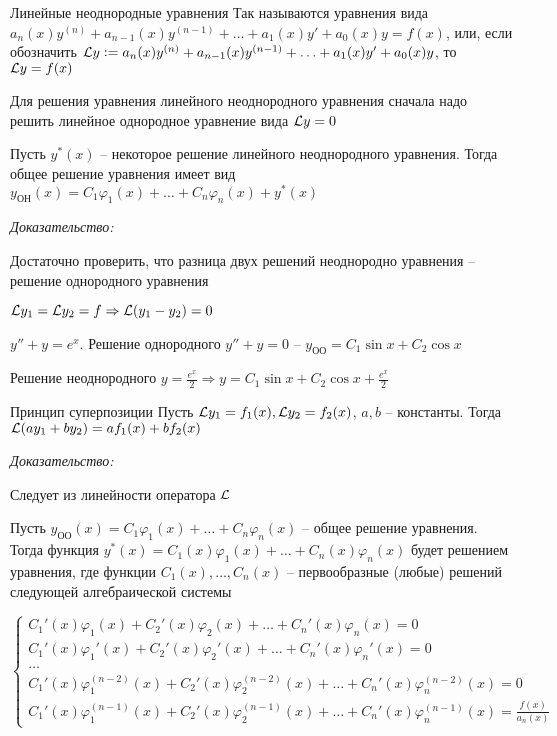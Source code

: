 \documentclass[12pt]{article}
\begin{document}
\begin{defin}{Линейные неоднородные уравнения}
    Так называются уравнения вида $a_n(x)y^{(n)} + a_{n - 1}(x)y^{(n - 1)} + \ldots + a_1(x)y' + a_0(x)y = f(x)$, или, если обозначить $\mathcal{L} y := a_n(x)y^{(n)} + a_{n - 1}(x)y^{(n - 1)} + \ldots + a_1(x)y' + a_0(x)y$, то $\mathcal{L} y = f(x)$

    Для решения уравнения линейного неоднородного уравнения сначала надо решить линейное однородное уравнение вида $\mathcal{L} y = 0$ 
\end{defin}

\begin{lem}{}
    Пусть $y^*(x)$ -- некоторое решение линейного неоднородного уравнения. Тогда общее решение уравнения имеет вид $y_\text{ОН}(x) = C_1\varphi_1(x) + \ldots + C_n\varphi_n(x) + y^*(x)$
\end{lem}

\textit{Доказательство:}

Достаточно проверить, что разница двух решений неоднородно уравнения -- решение однородного уравнения

$\mathcal{L} y_1 = \mathcal{L} y_2 = f \Rightarrow \mathcal{L}(y_1 - y_2) = 0$ 

\begin{Example}{}
    $y'' + y = e^x$. Решение однородного $y'' + y = 0$ -- $y_\text{ОО} = C_1\sin x + C_2\cos x$

    Решение неоднородного $y = \frac{e^x}{2} \Rightarrow y = C_1\sin x + C_2\cos x + \frac{e^x}{2}$
\end{Example}

\begin{lem}{Принцип суперпозиции}
    Пусть $\mathcal{L} y_1 = f_1(x), \mathcal{L} y_2 = f_2(x)$, $a, b$ -- константы. Тогда $\mathcal{L}(ay_1 + by_2) = af_1(x) + bf_2(x)$
\end{lem}

\textit{Доказательство:}

Следует из линейности оператора $\mathcal{L}$

\begin{theo}{}
    Пусть $y_\text{ОО}(x) = C_1\varphi_1(x) + \ldots + C_n\varphi_n(x)$ -- общее решение уравнения. Тогда функция $y^*(x) = C_1(x)\varphi_1(x) + \ldots + C_n(x)\varphi_n(x)$ будет решением уравнения, где функции $C_1(x), \ldots, C_n(x)$ -- первообразные (любые) решений следующей алгебраической системы 

    $\begin{cases}
        C_1'(x)\varphi_1(x) + C_2'(x)\varphi_2(x) + \ldots + C_n'(x)\varphi_n(x) = 0 \\
        C_1'(x)\varphi_1'(x) + C_2'(x)\varphi_2'(x) + \ldots + C_n'(x)\varphi_n'(x) = 0 \\
        \ldots \\
        C_1'(x)\varphi_1^{(n - 2)}(x) + C_2'(x)\varphi_2^{(n - 2)}(x) + \ldots + C_n'(x)\varphi_n^{(n - 2)}(x) = 0 \\
        C_1'(x)\varphi_1^{(n - 1)}(x) + C_2'(x)\varphi_2^{(n - 1)}(x) + \ldots + C_n'(x)\varphi_n^{(n - 1)}(x) = \frac{f(x)}{a_n(x)}
    \end{cases}$
\end{theo}
\end{document}
